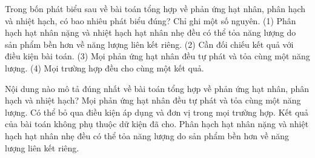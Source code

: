 \begin{ex}
Trong bốn phát biểu sau về bài toán tổng hợp về phản ứng hạt nhân, phân hạch và nhiệt hạch, có bao nhiêu phát biểu đúng? Chỉ ghi một số nguyên. (1) Phân hạch hạt nhân nặng và nhiệt hạch hạt nhân nhẹ đều có thể tỏa năng lượng do sản phẩm bền hơn về năng lượng liên kết riêng. (2) Cần đối chiếu kết quả với điều kiện bài toán. (3) Mọi phản ứng hạt nhân đều tự phát và tỏa cùng một năng lượng. (4) Mọi trường hợp đều cho cùng một kết quả.
\end{ex}

\begin{ex}
Nội dung nào mô tả đúng nhất về bài toán tổng hợp về phản ứng hạt nhân, phân hạch và nhiệt hạch?
\choice
{Mọi phản ứng hạt nhân đều tự phát và tỏa cùng một năng lượng.}
{Có thể bỏ qua điều kiện áp dụng và đơn vị trong mọi trường hợp.}
{Kết quả của bài toán không phụ thuộc dữ kiện đã cho.}
{\True Phân hạch hạt nhân nặng và nhiệt hạch hạt nhân nhẹ đều có thể tỏa năng lượng do sản phẩm bền hơn về năng lượng liên kết riêng.}
\end{ex}

